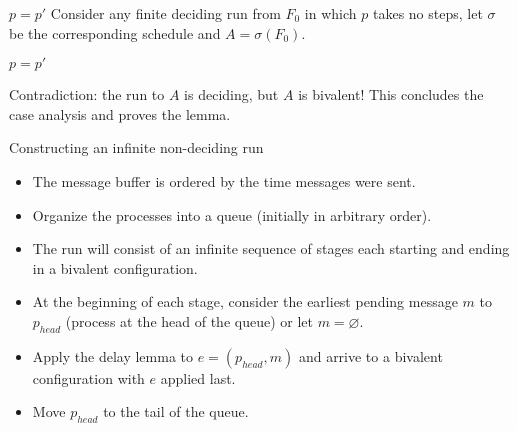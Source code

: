 \documentclass{beamer}
\begin{document}
\begin{frame}{$p = p'$}
  Consider any finite deciding run from $F_0$ in which $p$ takes no steps, let $\sigma$ be the corresponding schedule and $A = \sigma(F_0)$.
\end{frame}

\begin{frame}{$p = p'$}
  \begin{figure}[!h]
  \centering
  \end{figure}
  Contradiction: the run to $A$ is deciding, but $A$ is bivalent! This concludes the case analysis and proves the lemma.
\end{frame}

\begin{frame}{Constructing an infinite non-deciding run}
  \begin{itemize}
    \item The message buffer is ordered by the time messages were sent.
    \item Organize the processes into a queue (initially in arbitrary order).
    \item The run will consist of an infinite sequence of stages each starting and ending in a bivalent configuration.
    \item At the beginning of each stage, consider the earliest pending message $m$ to $p_{head}$ (process at the head of the queue) or let $m = \varnothing$.
    \item Apply the delay lemma to $e=(p_{head}, m)$ and arrive to a bivalent configuration with $e$ applied last.
    \item Move $p_{head}$ to the tail of the queue.
  \end{itemize}
\end{frame}
\end{document}
